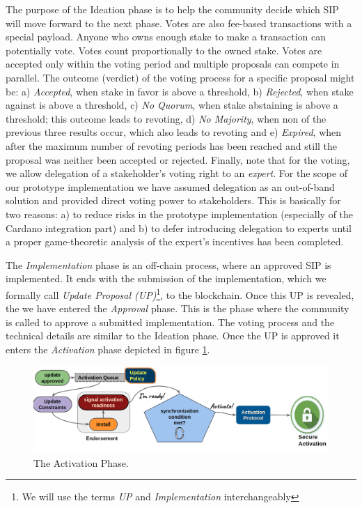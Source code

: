 {The purpose of the Ideation phase is to help the community decide which SIP
will move forward to the next phase. Votes are also fee-based transactions with
a special payload. Anyone who owns enough stake to make a transaction can
potentially vote. Votes count proportionally to the owned stake. Votes are
accepted only within the voting period and multiple proposals can compete in
parallel. The outcome (verdict) of the voting process for a specific proposal
might be: a) \emph{Accepted}, when stake in favor is above a threshold, b)
\emph{Rejected}, when stake against is above a threshold, c) \emph{No Quorum},
when stake abstaining is above a threshold; this outcome leads to revoting, d)
\emph{No Majority}, when non of the previous three results occur, which also
leads to revoting and e) \emph{Expired}, when after the maximum number of
revoting periods has been reached and still the proposal was neither been
accepted or rejected. Finally, note that for the voting, we allow delegation of
a stakeholder's voting right to an \emph{expert}. For the scope of our
prototype implementation we have assumed delegation as an out-of-band solution
and provided direct voting power to stakeholders. This is basically for two
reasons: a) to reduce risks in the prototype implementation (especially of the
Cardano integration part) and b) to defer introducing delegation to experts
until a proper game-theoretic analysis of the expert's incentives has been
completed.

The \emph{Implementation} phase is an off-chain process, where an approved SIP
is implemented. It ends with the submission of the implementation, which we
formally call \emph{Update Proposal (UP)}\footnote{We will use the terms
	\emph{UP} and \emph{Implementation} interchangeably}, to the blockchain. 
Once
this UP is
revealed, the we have entered the \emph{Approval} phase. This is the phase
where the community is called to approve a submitted implementation. The voting
process and the technical details are similar to the Ideation
phase. Once the
UP is approved it enters the \emph{Activation} phase depicted in figure
\ref{fig:activation_phase}.

\begin{figure}[h!] %
	\centering
	\includegraphics[width=0.8\columnwidth,
	keepaspectratio]{figures/activation_phase.png}
	\caption{The Activation Phase.}
	\label{fig:activation_phase}
\end{figure}

}
